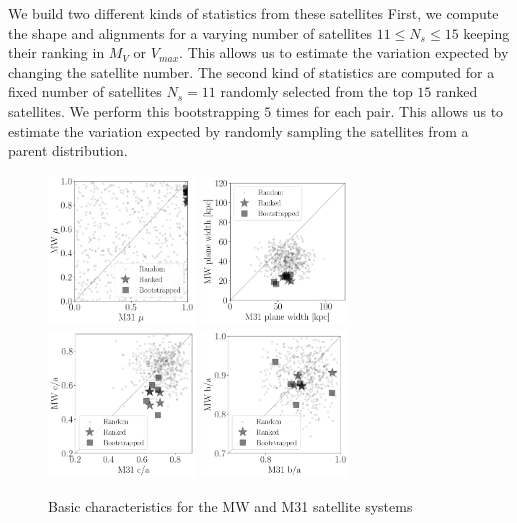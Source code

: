 \documentclass[a4paper,fleqn,usenatbib]{mnras}
\begin{document}
We build two different kinds of statistics from these satellites
First, we compute the shape and alignments for a varying number of
satellites $11\leq N_{s}\leq 15$ keeping their ranking in
$M_V$ or $V_{max}$. 
This allows us to estimate the variation expected by changing the
satellite number. 
The second kind of statistics are computed for a fixed number of
satellites $N_{s}=11$ randomly selected from the top $15$ ranked
satellites. 
We perform this bootstrapping $5$ times for each pair. 
This allows us to estimate the variation expected by randomly sampling
the satellites from a parent distribution.






\begin{figure}
\centering
\includegraphics[width=0.35\textwidth]{LG_scatter_mu.pdf}
\includegraphics[width=0.35\textwidth]{LG_scatter_width.pdf}
\includegraphics[width=0.35\textwidth]{LG_scatter_ca_ratio.pdf}
\includegraphics[width=0.35\textwidth]{LG_scatter_ba_ratio.pdf}
\caption{Basic characteristics for the MW and M31 satellite systems
\label{fig:lg_scatter}}
\end{figure}
\end{document}
